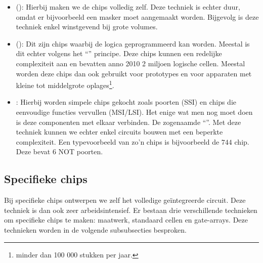 \begin{itemize}
 \item {} (): Hierbij maken we de chips volledig zelf. Deze techniek is echter duur, omdat er bijvoorbeeld een masker moet aangemaakt worden. Bijgevolg is deze techniek enkel winstgevend bij grote volumes.
 \item {} (): Dit zijn chips waarbij de logica geprogrammeerd kan worden. Meestal is dit echter volgens het ``'' principe. Deze chips kunnen een redelijke complexiteit aan en bevatten anno 2010 2 miljoen logische cellen. Meestal worden deze chips dan ook gebruikt voor prototypes en voor apparaten met kleine tot middelgrote oplages\footnote{minder dan 100 000 stukken per jaar.}.
 \item {}: Hierbij worden simpele chips gekocht zoals poorten (SSI) en chips die eenvoudige functies vervullen (MSI/LSI). Het enige wat men nog moet doen is deze componenten met elkaar verbinden. De zogenaamde ``''. Met deze techniek kunnen we echter enkel circuits bouwen met een beperkte complexiteit. Een typevoorbeeld van zo'n chips is bijvoorbeeld de $744$ chip. Deze bevat $6$ NOT poorten.
\end{itemize}

\subsection{Specifieke chips}
Bij specifieke chips ontwerpen we zelf het volledige ge\"integreerde circuit. Deze techniek is dan ook zeer arbeidsintensief. Er bestaan drie verschillende technieken om specifieke chips te maken: maatwerk, standaard cellen en gate-arrays. Deze technieken worden in de volgende subsubsecties besproken.

